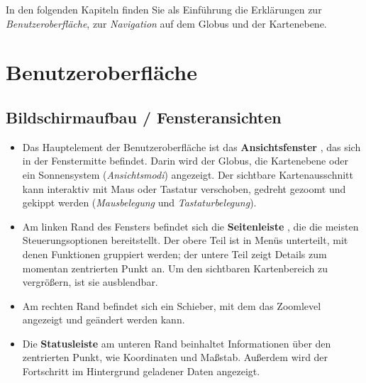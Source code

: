 \documentclass[10pt]{scrreprt}
\newcommand{\textref}[1]{\mbox{\raisebox{0.1ex}{\small$\rightarrow$ }\textit{#1}}}
\begin{document}
\vspace{5mm}
In den folgenden Kapiteln finden Sie als Einführung die Erklärungen zur \textref{Benutzeroberfläche}, zur \textref{Navigation} auf dem Globus und der Kartenebene.


\newpage
\section{Benutzeroberfläche}       
\vspace{3mm}
\subsection{Bildschirmaufbau / Fensteransichten}
\begin{itemize}
	\item Das Hauptelement der Benutzeroberfläche ist das \textbf{Ansichtsfenster}  , das sich in der Fenstermitte befindet. Darin wird der Globus, die Kartenebene oder ein Sonnensystem (\textref{Ansichtsmodi}) angezeigt. Der sichtbare Kartenausschnitt kann interaktiv mit Maus oder Tastatur verschoben, gedreht gezoomt und gekippt werden (\textref{Mausbelegung} und \textref{Tastaturbelegung}).
	\item Am linken Rand des Fensters befindet sich die \textbf{Seitenleiste} , die die meisten Steuerungsoptionen bereitstellt. Der obere Teil ist in Menüs unterteilt, mit denen Funktionen gruppiert werden; der untere Teil zeigt Details zum momentan zentrierten Punkt an. Um den sichtbaren Kartenbereich zu vergrößern, ist sie ausblendbar.
	\item Am rechten Rand  befindet sich ein Schieber, mit dem das Zoomlevel angezeigt und geändert werden kann.
	\item Die \textbf{Statusleiste}  am unteren Rand beinhaltet Informationen über den zentrierten Punkt, wie Koordinaten und Maßstab. Außerdem wird der Fortschritt im Hintergrund geladener Daten angezeigt.
\end{itemize}
\end{document}
